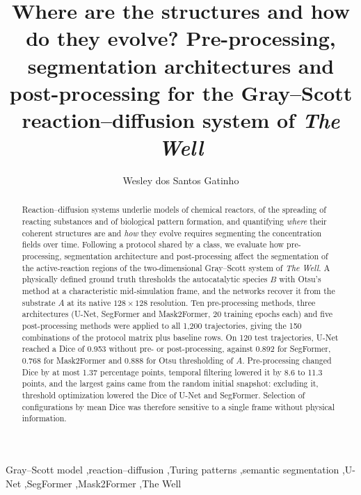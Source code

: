 \documentclass[preprint,12pt,authoryear]{elsarticle}
\begin{document}
\begin{frontmatter}

\title{Where are the structures and how do they evolve? Pre-processing, segmentation architectures and post-processing for the Gray--Scott reaction--diffusion system of \emph{The Well}}

\author[ufma]{Wesley dos Santos Gatinho}

\begin{abstract}
Reaction--diffusion systems underlie models of chemical reactors, of the spreading of reacting substances and of biological pattern formation, and quantifying \emph{where} their coherent structures are and \emph{how} they evolve requires segmenting the concentration fields over time. Following a protocol shared by a class, we evaluate how pre-processing, segmentation architecture and post-processing affect the segmentation of the active-reaction regions of the two-dimensional Gray--Scott system of \emph{The Well}. A physically defined ground truth thresholds the autocatalytic species $B$ with Otsu's method at a characteristic mid-simulation frame, and the networks recover it from the substrate $A$ at its native $128\times128$ resolution. Ten pre-processing methods, three architectures (U-Net, SegFormer and Mask2Former, 20 training epochs each) and five post-processing methods were applied to all 1,200 trajectories, giving the 150 combinations of the protocol matrix plus baseline rows. On 120 test trajectories, U-Net reached a Dice of 0.953 without pre- or post-processing, against 0.892 for SegFormer, 0.768 for Mask2Former and 0.888 for Otsu thresholding of $A$. Pre-processing changed Dice by at most 1.37 percentage points, temporal filtering lowered it by 8.6 to 11.3 points, and the largest gains came from the random initial snapshot: excluding it, threshold optimization lowered the Dice of U-Net and SegFormer. Selection of configurations by mean Dice was therefore sensitive to a single frame without physical information.
\end{abstract}

\begin{keyword}
Gray--Scott model \sep reaction--diffusion \sep Turing patterns \sep semantic segmentation \sep U-Net \sep SegFormer \sep Mask2Former \sep The Well
\end{keyword}

\end{frontmatter}
\end{document}
